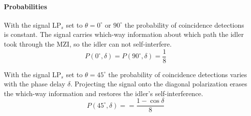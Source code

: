 \documentclass{article}
\begin{document}
\paragraph{Probabilities}

With the signal LP$_s$ set to $\theta=0^\circ$ or $90^\circ$ the probability of
coincidence detections is constant.
The signal carries which-way information about which path the idler took
through the MZI, so the idler can not self-interfere.
\[
P(0^\circ, \delta)=P(90^\circ, \delta)=\frac{1}{8}
\]

With the signal LP$_s$ set to $\theta=45^\circ$ the probability of
coincidence detections varies with the phase delay $\delta$.
Projecting the signal onto the diagonal polarization erases the
which-way information and restores the idler's self-interference.
\[
P(45^\circ, \delta)==\frac{1-\cos\delta}{8}
\]
\end{document}
